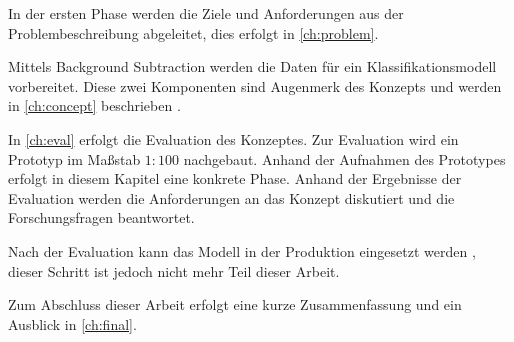 In der ersten Phase  werden die Ziele und Anforderungen aus der Problembeschreibung abgeleitet, dies erfolgt in \autoref{ch:problem}.

Mittels Background Subtraction werden die Daten für ein Klassifikationsmodell vorbereitet.
Diese zwei Komponenten sind Augenmerk des Konzepts und werden in \autoref{ch:concept} beschrieben .

In \autoref{ch:eval} erfolgt die Evaluation des Konzeptes.
Zur Evaluation wird ein Prototyp im Maßstab $1:100$ nachgebaut.
Anhand der Aufnahmen des Prototypes erfolgt in diesem Kapitel eine konkrete  Phase.
Anhand der Ergebnisse der Evaluation werden die Anforderungen an das Konzept diskutiert und die Forschungsfragen beantwortet.

Nach der Evaluation kann das Modell in der Produktion eingesetzt werden , dieser Schritt ist jedoch nicht mehr Teil dieser Arbeit.

Zum Abschluss dieser Arbeit erfolgt eine kurze Zusammenfassung und ein Ausblick in \autoref{ch:final}.




